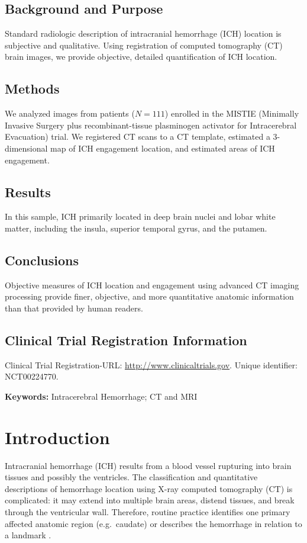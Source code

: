 \documentclass[12pt]{article}\usepackage[]{graphicx}\usepackage[]{color}
\begin{document}
\begin{refsection}
\subsection*{Background and Purpose}
Standard radiologic description of intracranial hemorrhage (ICH) location is subjective and qualitative.  Using registration of computed tomography (CT) brain images, we provide objective, detailed quantification of ICH location.

\subsection*{Methods}
We analyzed images from patients ($N{=}111$) enrolled in the MISTIE (Minimally Invasive Surgery plus recombinant-tissue plasminogen activator for Intracerebral Evacuation) trial.  We registered CT scans to a CT template, estimated a 3-dimensional map of ICH engagement location, and estimated areas of ICH engagement. 

\subsection*{Results}
In this sample, ICH primarily located in deep brain nuclei and lobar white matter, including the insula, superior temporal gyrus, and the putamen.

\subsection*{Conclusions}
Objective measures of ICH location and engagement using advanced CT imaging processing provide finer, objective, and more quantitative anatomic information than that provided by human readers. 

\subsection*{Clinical Trial Registration Information}
Clinical Trial Registration-URL: \url{http://www.clinicaltrials.gov}. Unique identifier: NCT00224770.


{\bf Keywords:} Intracerebral Hemorrhage; CT and MRI

\newpage

\section*{Introduction}

Intracranial hemorrhage (ICH) results from a blood vessel rupturing into brain tissues and possibly the ventricles. The classification and quantitative descriptions of hemorrhage location using X-ray computed tomography (CT) is complicated: it may extend into multiple brain areas, distend tissues, and break through the ventricular wall. Therefore, routine practice identifies one primary affected anatomic region (e.g.~caudate) \citep{mendelow_early_2013, anderson_intensive_2008, antihypertensive_treatment_of_acute_cerebral_hemorrhage_atach_investigators_antihypertensive_2010} or describes the hemorrhage in relation to a landmark \citep{ziai_multicenter_2014}.


\end{refsection}
\end{document}
